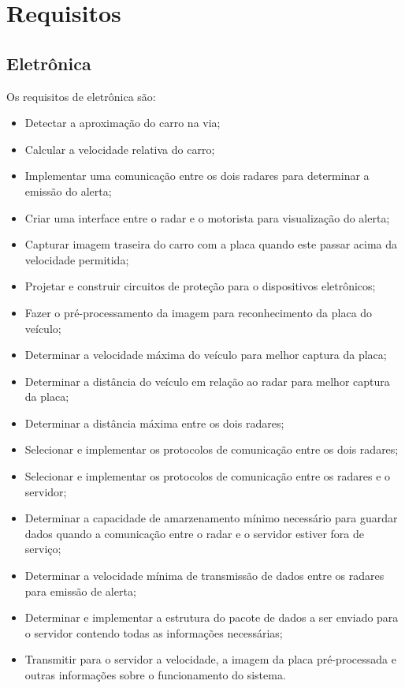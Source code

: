\section{Requisitos}
\subsection{Eletrônica}

Os requisitos de eletrônica são:
	
\begin{itemize}
	\item Detectar a aproximação do carro na via;
    \item Calcular a velocidade relativa do carro;
    \item Implementar uma comunicação entre os dois radares para determinar a emissão do alerta;
    \item Criar uma interface entre o radar e o motorista para visualização do alerta;
    \item Capturar imagem traseira do carro com a placa quando este passar acima da velocidade permitida;
    \item Projetar e construir circuitos de proteção para o dispositivos eletrônicos;
    \item Fazer o pré-processamento da imagem para reconhecimento da placa do veículo;
    \item Determinar a velocidade máxima do veículo para melhor captura da placa;
    \item Determinar a distância do veículo em relação ao radar para melhor captura da placa;
    \item Determinar a distância máxima entre os dois radares;
    \item Selecionar e implementar os protocolos de comunicação entre os dois radares;
    \item Selecionar e implementar os protocolos de comunicação entre os radares e o servidor;
     \item Determinar a capacidade de amarzenamento mínimo necessário para guardar dados quando a comunicação entre o radar e o servidor estiver fora de serviço;
     \item Determinar a velocidade mínima de transmissão de dados entre os radares para emissão de alerta;
     \item Determinar e implementar a estrutura do pacote de dados a ser enviado para o servidor contendo todas as informações necessárias;
     \item Transmitir para o servidor a velocidade, a imagem da placa pré-processada  e outras informações sobre o funcionamento do sistema.
\end{itemize}    
    

